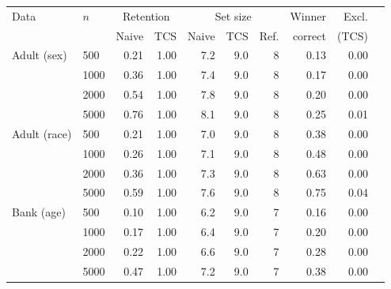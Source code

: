 \begin{tabular}{llrrrrrrrr}\toprule
Data & $n$ & \multicolumn{2}{c}{Retention} & \multicolumn{3}{c}{Set size} & Winner & Excl. \\
 & & Naive & TCS & Naive & TCS & Ref. & correct & (TCS) \\\midrule
Adult (sex) & 500 & 0.21 & 1.00 & 7.2 & 9.0 & 8 & 0.13 & 0.00 \\
 & 1000 & 0.36 & 1.00 & 7.4 & 9.0 & 8 & 0.17 & 0.00 \\
 & 2000 & 0.54 & 1.00 & 7.8 & 9.0 & 8 & 0.20 & 0.00 \\
 & 5000 & 0.76 & 1.00 & 8.1 & 9.0 & 8 & 0.25 & 0.01 \\
Adult (race) & 500 & 0.21 & 1.00 & 7.0 & 9.0 & 8 & 0.38 & 0.00 \\
 & 1000 & 0.26 & 1.00 & 7.1 & 9.0 & 8 & 0.48 & 0.00 \\
 & 2000 & 0.36 & 1.00 & 7.3 & 9.0 & 8 & 0.63 & 0.00 \\
 & 5000 & 0.59 & 1.00 & 7.6 & 9.0 & 8 & 0.75 & 0.04 \\
Bank (age) & 500 & 0.10 & 1.00 & 6.2 & 9.0 & 7 & 0.16 & 0.00 \\
 & 1000 & 0.17 & 1.00 & 6.4 & 9.0 & 7 & 0.20 & 0.00 \\
 & 2000 & 0.22 & 1.00 & 6.6 & 9.0 & 7 & 0.28 & 0.00 \\
 & 5000 & 0.47 & 1.00 & 7.2 & 9.0 & 7 & 0.38 & 0.00 \\
\bottomrule\end{tabular}